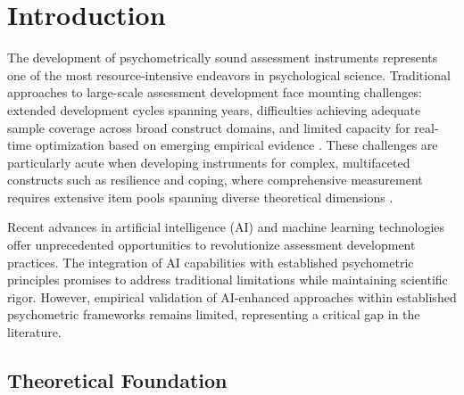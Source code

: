 \documentclass[12pt,a4paper]{article}
\begin{document}
\begin{abstract}
\textbf{Conclusions:} AI-enhanced item development offers a paradigm shift toward dynamic, data-driven optimization while maintaining psychometric rigor. The enhanced RCQ provides a theoretically grounded, psychometrically robust instrument for resilience-coping assessment. The framework demonstrates broad applicability for psychological assessment development, offering significant improvements in efficiency, precision, and scalability. Implications for future assessment development and the integration of AI technologies in psychometric practice are discussed.

\textbf{Keywords:} artificial intelligence, item response theory, resilience assessment, bifactor models, assessment development, psychometric validation

\end{abstract}

\newpage

\section{Introduction}

The development of psychometrically sound assessment instruments represents one of the most resource-intensive endeavors in psychological science. Traditional approaches to large-scale assessment development face mounting challenges: extended development cycles spanning years, difficulties achieving adequate sample coverage across broad construct domains, and limited capacity for real-time optimization based on emerging empirical evidence \cite{Embretson2013, VanderLinden2016}. These challenges are particularly acute when developing instruments for complex, multifaceted constructs such as resilience and coping, where comprehensive measurement requires extensive item pools spanning diverse theoretical dimensions \cite{Connor2003, Carver1997}.

Recent advances in artificial intelligence (AI) and machine learning technologies offer unprecedented opportunities to revolutionize assessment development practices. The integration of AI capabilities with established psychometric principles promises to address traditional limitations while maintaining scientific rigor. However, empirical validation of AI-enhanced approaches within established psychometric frameworks remains limited, representing a critical gap in the literature.

\subsection{Theoretical Foundation}
\end{document}
